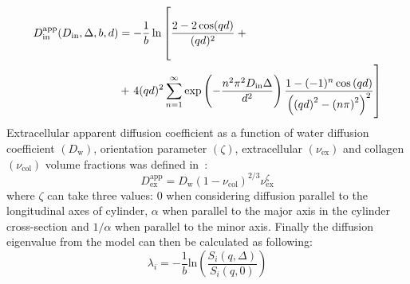 \begin{equation}\label{eq: Karger AppEx}
\begin{split}
	D^{\mathrm{app}}_{\mathrm{in}} (D_{\mathrm{in}},\Delta, b, d) &= -\dfrac{1}{b} \ln  \left[ \frac{2 - 2 \cos(qd)}{(qd)^2} + \vphantom{ \exp \left( - \frac{n^2 \pi^2 D_{\mathrm{in}} \Delta}{d^2}\right)\frac{1-(-1)^n \cos{(qd)}}{\left( \left(qd\right)^2 - \left( n \pi\right)^2\right)^2}} \right. \\
                   &+ \left. 4(qd)^2 \sum^{\infty}_{n=1} \exp \left( - \frac{n^2 \pi^2 D_{\mathrm{in}} \Delta}{d^2}\right)\frac{1-(-1)^n \cos{(qd)}}{\left( \left(qd\right)^2 - \left( n \pi\right)^2\right)^2} \right]
\end{split}
\end{equation}
Extracellular apparent diffusion coefficient as a function of water diffusion coefficient $(D_{\mathrm{w}})$, orientation parameter $(\zeta)$, extracellular $(\nu_{\mathrm{ex}})$ and collagen $(\nu_{\mathrm{col}})$ volume fractions was defined in~\cite{RND12}:
\begin{equation}\label{eq: Karger AppEx}
D^{\mathrm{app}}_{\mathrm{ex}}=D_{\mathrm{w}}(1-\nu_{\mathrm{col}})^{2/3}\nu_{\mathrm{ex}}^\zeta
\end{equation}
where $\zeta$ can take three values: 0 when considering diffusion parallel to the longitudinal axes of cylinder, $\alpha$ when parallel to the major axis in the cylinder cross-section and $1/\alpha$ when parallel to the minor axis.
Finally the diffusion eigenvalue from the model can then be calculated as following:
\begin{equation}\label{eq: Karger AppEx}
\lambda_i = -\frac{1}{b} \mathrm{ln}\left( \frac{S_i(q,\Delta)}{S_i(q,0)}\right)
\end{equation}

